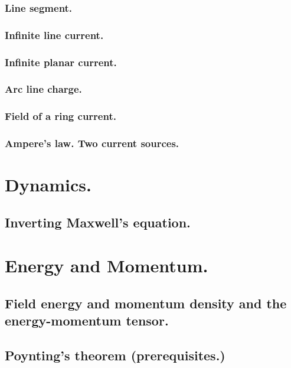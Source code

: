          \subsubsection{Line segment.}
            
         \subsubsection{Infinite line current.}
            
         \subsubsection{Infinite planar current.}
            
         \subsubsection{Arc line charge.}
            
         \subsubsection{Field of a ring current.}
            
         \subsubsection{Ampere's law.  Two current sources.}
            
      \section{Dynamics.}
         \subsection{Inverting Maxwell's equation.}
            
      \section{Energy and Momentum.}
         \subsection{Field energy and momentum density and the energy-momentum tensor.}
            
         \subsection{Poynting's theorem (prerequisites.)}
            
